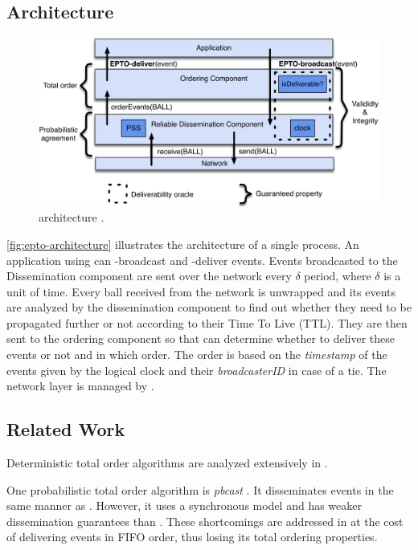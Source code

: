 \subsection{\epto Architecture}
\begin{figure}[htp]
	\includegraphics[width=\linewidth]{figures/architecture.pdf}
	\caption{\epto architecture \autocite{matos2015epto}.}
	\label{fig:epto-architecture}
\end{figure}
\autoref{fig:epto-architecture} illustrates the architecture of a single \epto process. An application using \epto can \epto-broadcast and \epto-deliver events. Events broadcasted to the Dissemination component are sent over the network every $\delta$ period, where $\delta$ is a unit of time. Every ball received from the network is unwrapped and its events are analyzed by the dissemination component to find out whether they need to be propagated further or not according to their Time To Live (TTL). They are then sent to the ordering component so that \epto can determine whether to deliver these events or not and in which order. The order is based on the \textit{timestamp} of the events given by the logical clock and their \textit{broadcasterID} in case of a tie. The network layer is managed by \eptotester.
\subsection{Related Work}
Deterministic total order algorithms are analyzed extensively in \autocite{defago2004total}.

One probabilistic total order algorithm is \textit{pbcast} \autocite{pbcast1996}. It disseminates events in the same manner as \epto. However, it uses a synchronous model and has weaker dissemination guarantees than \epto. These shortcomings are addressed in \autocite{birman1999bimodal} at the cost of delivering events in FIFO order, thus losing its total ordering properties.

